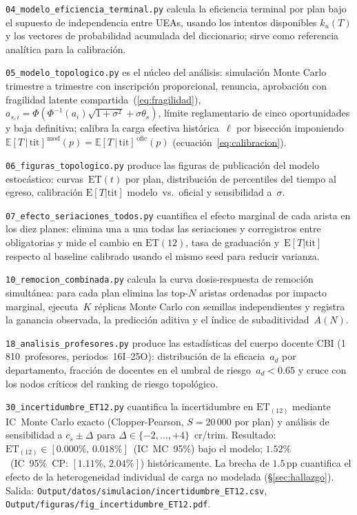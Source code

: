 \documentclass[11pt,letterpaper]{article}
\newcommand{\ET}[1]{\mathrm{ET}_{(#1)}}
\newcommand{\ETtit}{\mathbb{E}[T\,|\,\mathrm{tit}]}
\begin{document}
\begin{sloppypar}
\texttt{04\_modelo\_eficiencia\_terminal.py}
calcula la eficiencia terminal por plan bajo el supuesto de independencia entre
UEAs, usando los intentos disponibles $k_u(T)$ y los vectores de probabilidad
acumulada del diccionario; sirve como referencia analítica para la calibración.

\texttt{05\_modelo\_topologico.py}
es el núcleo del análisis: simulación Monte Carlo trimestre a trimestre con
inscripción proporcional, renuncia, aprobación con fragilidad latente
compartida~(\ref{eq:fragilidad}),
$a_{s,i}=\Phi(\Phi^{-1}(a_i)\sqrt{1+\sigma^2}+\sigma\theta_s)$,
límite reglamentario de cinco oportunidades y baja definitiva;
calibra la carga efectiva histórica~$\ell$ por bisección imponiendo
$\ETtit^{\,\mathrm{mod}}(p)=\ETtit^{\,\mathrm{ofic}}(p)$
(ecuación~\ref{eq:calibracion}).

\texttt{06\_figuras\_topologico.py}
produce las figuras de publicación del modelo estocástico: curvas~$\mathrm{ET}(t)$
por plan, distribución de percentiles del tiempo al egreso, calibración
$\mathrm{E}[T|\text{tit}]$ modelo~vs.~oficial y sensibilidad a~$\sigma$.

\texttt{07\_efecto\_seriaciones\_todos.py}
cuantifica el efecto marginal de cada arista en los diez planes: elimina
una a una todas las seriaciones y corregistros entre obligatorias y mide el
cambio en $\mathrm{ET}(12)$, tasa de graduación y~$\mathrm{E}[T|\text{tit}]$
respecto al baseline calibrado usando el mismo seed para reducir varianza.

\texttt{10\_remocion\_combinada.py}
calcula la curva dosis-respuesta de remoción simultánea: para cada plan
elimina las top-$N$ aristas ordenadas por impacto marginal, ejecuta~$K$
réplicas Monte Carlo con semillas independientes y registra la ganancia
observada, la predicción aditiva y el índice de subaditividad~$A(N)$.

\texttt{18\_analisis\_profesores.py}
produce las estadísticas del cuerpo docente CBI (1\,810~profesores,
periodos~16I--25O): distribución de la eficacia~$a_d$ por departamento,
fracción de docentes en el umbral de riesgo~$a_d < 0.65$ y cruce con
los nodos críticos del ranking de riesgo topológico.

\texttt{30\_incertidumbre\_ET12.py}
cuantifica la incertidumbre en $\ET{12}$ mediante IC~Monte Carlo exacto
(Clopper-Pearson, $S=20\,000$ por plan) y análisis de sensibilidad a
$c_s\pm\Delta$ para $\Delta\in\{-2,\ldots,+4\}$~cr/trim.
Resultado: $\ET{12}\in[0.000\%,\,0.018\%]$~(IC~MC~95\%) bajo el modelo;
$1.52\%$~(IC~95\%~CP: $[1.11\%,\,2.04\%]$) históricamente.
La brecha de $1.5\,\text{pp}$ cuantifica el efecto de la heterogeneidad individual
de carga no modelada (\S\ref{sec:hallazgo}).
Salida: \texttt{Output/datos/simulacion/incertidumbre\_ET12.csv},
        \texttt{Output/figuras/fig\_incertidumbre\_ET12.pdf}.


\end{sloppypar}
\end{document}
